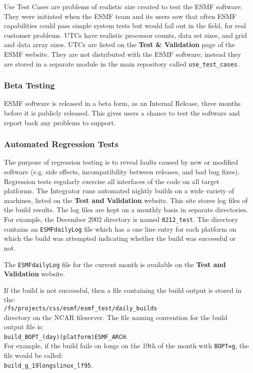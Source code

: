 Use Test Cases are problems of realistic size created to test the ESMF
software.  They were initiated when the ESMF team and its users saw that
often ESMF capabilities could pass simple system tests but would fail
out in the field, for real customer problems.  UTCs have realistic
processor counts, data set sizes, and grid and data array sizes.  UTCs are
listed on the {\bf Test \& Validation} page of the ESMF website.  They
are not distributed with the ESMF software; instead they are stored in
a separate module in the main repository called {\tt use\_test\_cases}.

\subsubsection{Beta Testing}

ESMF software is released in a beta form, as an Internal Release,
three months before it is publicly released.  This gives users
a chance to test the software and report back any problems to 
support.

\subsubsection{Automated Regression Tests}

The purpose of regression testing is to reveal faults caused by new
or modified software (e.g. side effects, incompatibility between 
releases, and bad bug fixes).  
Regression tests regularly exercise all interfaces of the code on 
all target platforms.  The Integrator runs 
automated nightly builds on a wide variety of machines, listed on the
{\bf Test and Validation} website. This site stores log files of the
build results.
The log files are kept on a monthly basis in 
separate directories. For example, the December 2002 directory is named {\tt 0212\_test}. The 
directory contains an {\tt ESMFdailyLog} file which has a one line entry for each platform on 
which the build was attempted indicating whether the build was successful or not. 

The {\tt ESMFdailyLog} file for the current month is available on the {\bf Test and Validation} website.

If the build is not successful, then a file containing the build output is stored in 
the:\\
{\tt /fs/projects/css/esmf/esmf\_test/daily\_builds}\\
directory on the NCAR fileserver. The file naming convention for the build output file is:\\
{\tt build\_BOPT\_(day)(platform)ESMF\_ARCH}.\\
For example, if the build fails on longs on the 19th of the month with {\tt BOPT=g},
the file would be called:\\
{\tt build\_g\_19longslinux\_lf95}. 

